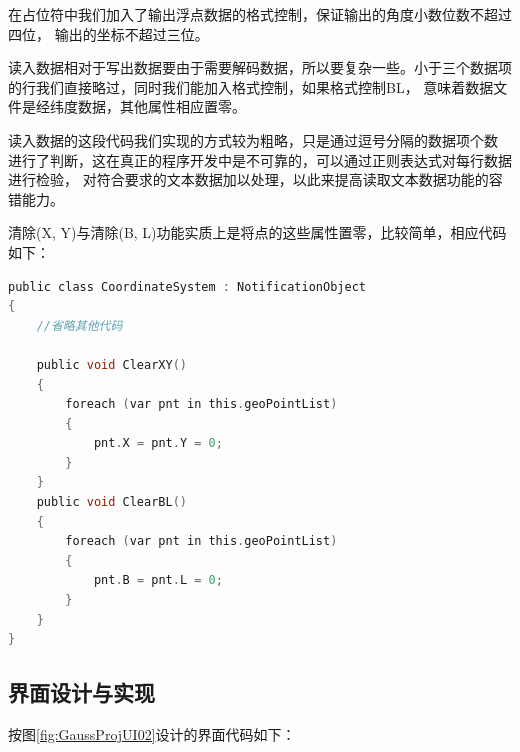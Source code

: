 在占位符中我们加入了输出浮点数据的格式控制，保证输出的角度小数位数不超过四位，
输出的坐标不超过三位。

读入数据相对于写出数据要由于需要解码数据，所以要复杂一些。小于三个数据项
的行我们直接略过，同时我们能加入格式控制，如果格式控制BL，
意味着数据文件是经纬度数据，其他属性相应置零。

读入数据的这段代码我们实现的方式较为粗略，只是通过逗号分隔的数据项个数
进行了判断，这在真正的程序开发中是不可靠的，可以通过正则表达式对每行数据进行检验，
对符合要求的文本数据加以处理，以此来提高读取文本数据功能的容错能力。

清除(X, Y)与清除(B, L)功能实质上是将点的这些属性置零，比较简单，相应代码如下：

\begin{lstlisting}[language=C]
public class CoordinateSystem : NotificationObject 
{
    //省略其他代码

    public void ClearXY()
    {
        foreach (var pnt in this.geoPointList)
        {
            pnt.X = pnt.Y = 0;
        }
    }
    public void ClearBL()
    {
        foreach (var pnt in this.geoPointList)
        {
            pnt.B = pnt.L = 0;
        }
    }
}
\end{lstlisting}


\subsection{界面设计与实现}

按图\ref{fig:GaussProjUI02}设计的界面代码如下：

